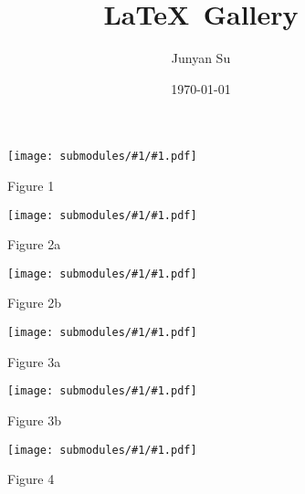 \documentclass{article}
\title{\LaTeX\, Gallery}
\author{Junyan Su}
\date{\today}
\begin{document}
\maketitle

\newcommand{\includeSubmodule}[1]{
    \begin{figure}[ht]
        \begin{center}
            \texttt{[image: submodules/\#1/\#1.pdf]}
        \end{center} 
        \caption*{Figure #1}
    \end{figure}
}
\includeSubmodule{1}
\includeSubmodule{2a}
\includeSubmodule{2b}
\includeSubmodule{3a}
\includeSubmodule{3b}
\includeSubmodule{4}



%
%
\end{document}
